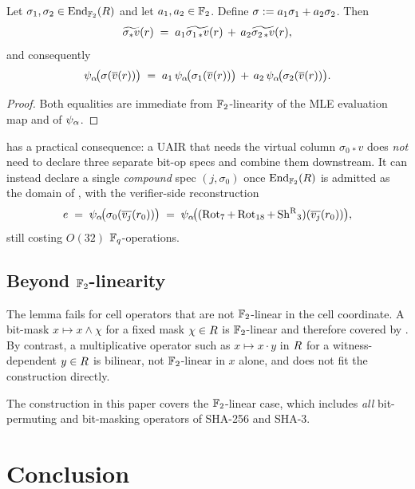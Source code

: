\begin{lemma}[Linearity]
\label{lem:linearity}
Let $\sigma_1,\sigma_2 \in \operatorname{End}_{\mathbb{F}_2}(R)$ and let $a_1, a_2
\in \mathbb{F}_2$. Define $\sigma := a_1 \sigma_1 + a_2 \sigma_2$. Then
\[
  \widetilde{\sigma_* v}(r) \;=\; a_1 \widetilde{\sigma_{1\,*} v}(r) \,+\, a_2 \widetilde{\sigma_{2\,*} v}(r),
\]
and consequently
\[
  \psi_{\alpha}\!\big(\sigma(\overline{v}(r))\big) \;=\; a_1\, \psi_{\alpha}\!\big(\sigma_1(\overline{v}(r))\big) \,+\, a_2\, \psi_{\alpha}\!\big(\sigma_2(\overline{v}(r))\big).
\]
\end{lemma}

\begin{proof}
Both equalities are immediate from $\mathbb{F}_2$-linearity of the MLE
evaluation map and of $\psi_{\alpha}$.
\end{proof}

 has a practical consequence: a UAIR that needs
the virtual column $\sigma_{0\,*} v$ does \emph{not} need to declare
three separate bit-op specs and combine them downstream. It can
instead declare a single \emph{compound} spec
$(j, \sigma_0)$ once $\operatorname{End}_{\mathbb{F}_2}(R)$ is admitted as the
domain of , with the verifier-side reconstruction
\[
  e \;=\; \psi_{\alpha}\!\big(\sigma_0(\overline{v_j}(r_0))\big)
        \;=\; \psi_{\alpha}\!\big((\operatorname{Rot}_7 + \operatorname{Rot}_{18} + \operatorname{Sh^{R}}_3)(\overline{v_j}(r_0))\big),
\]
still costing $O(32)$ $\mathbb{F}_q$-operations.

\subsection{Beyond $\mathbb{F}_2$-linearity}

The lemma fails for cell operators that are not $\mathbb{F}_2$-linear in the
cell coordinate. A bit-mask $x \mapsto x \wedge \chi$ for a fixed mask
$\chi \in R$ is $\mathbb{F}_2$-linear and therefore covered by
. By contrast, a multiplicative operator such as
$x \mapsto x \cdot y$ in $R$ for a witness-dependent
$y \in R$ is bilinear, not $\mathbb{F}_2$-linear in $x$ alone, and
does not fit the construction directly.

The construction in this paper covers the $\mathbb{F}_2$-linear case, which
includes \emph{all} bit-permuting and bit-masking operators of
SHA-256 and SHA-3.

\section*{Conclusion}


